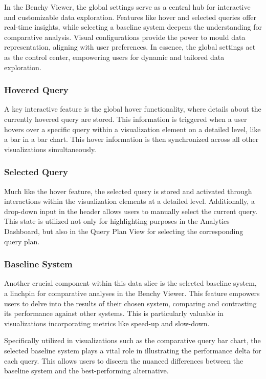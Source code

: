 In the Benchy Viewer, the global settings serve as a central hub for interactive and customizable data exploration. Features like hover and selected queries offer real-time insights, while selecting a baseline system deepens the understanding for comparative analysis. Visual configurations provide the power to mould data representation, aligning with user preferences. In essence, the global settings act as the control center, empowering users for dynamic and tailored data exploration.

\subsubsection{Hovered Query}

A key interactive feature is the global hover functionality, where details about the currently hovered query are stored. This information is triggered when a user hovers over a specific query within a visualization element on a detailed level, like a bar in a bar chart. This hover information is then synchronized across all other visualizations simultaneously.

\subsubsection{Selected Query}

Much like the hover feature, the selected query is stored and activated through interactions within the visualization elements at a detailed level. Additionally, a drop-down input in the header allows users to manually select the current query. This state is utilized not only for highlighting purposes in the Analytics Dashboard, but also in the Query Plan View for selecting the corresponding query plan.

\subsubsection{Baseline System}

Another crucial component within this data slice is the selected baseline system, a linchpin for comparative analyses in the Benchy Viewer. This feature empowers users to delve into the results of their chosen system, comparing and contrasting its performance against other systems. This is particularly valuable in visualizations incorporating metrics like speed-up and slow-down.

Specifically utilized in visualizations such as the comparative query bar chart, the selected baseline system plays a vital role in illustrating the performance delta for each query. This allows users to discern the nuanced differences between the baseline system and the best-performing alternative. 

